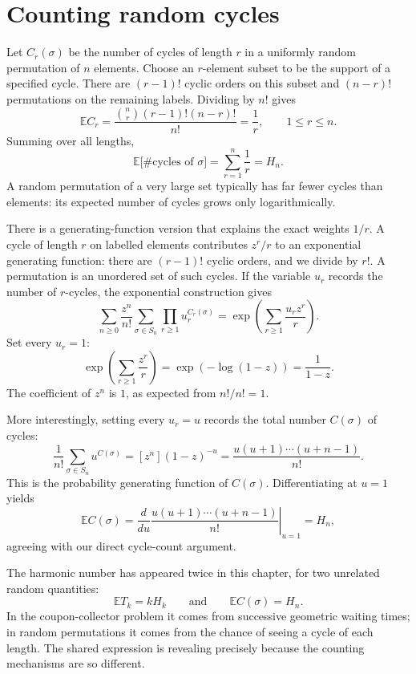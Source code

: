 \section{Counting random cycles}

Let \(C_r(\sigma)\) be the number of cycles of length \(r\) in a uniformly random permutation of \(n\) elements. Choose an \(r\)-element subset to be the support of a specified cycle. There are \((r-1)!\) cyclic orders on this subset and \((n-r)!\) permutations on the remaining labels. Dividing by \(n!\) gives
\[
 \boxed{\mathbb E C_r
 =\frac{\binom nr(r-1)!(n-r)!}{n!}
 =\frac1r,\qquad 1\le r\le n.}
\]
Summing over all lengths,
\[
 \boxed{\mathbb E\bigl[\#\text{cycles of }\sigma\bigr]
 =\sum_{r=1}^n\frac1r=H_n.}
\]
A random permutation of a very large set typically has far fewer cycles than elements: its expected number of cycles grows only logarithmically.

There is a generating-function version that explains the exact weights \(1/r\). A cycle of length \(r\) on labelled elements contributes \(z^r/r\) to an exponential generating function: there are \((r-1)!\) cyclic orders, and we divide by \(r!\). A permutation is an unordered set of such cycles. If the variable \(u_r\) records the number of \(r\)-cycles, the exponential construction gives
\[
 \boxed{
 \sum_{n\ge0}\frac{z^n}{n!}
 \sum_{\sigma\in S_n}\prod_{r\ge1}u_r^{C_r(\sigma)}
 =\exp\left(\sum_{r\ge1}\frac{u_rz^r}{r}\right).
 }
\]
Set every \(u_r=1\):
\[
 \exp\left(\sum_{r\ge1}\frac{z^r}{r}\right)
 =\exp(-\log(1-z))=\frac1{1-z}.
\]
The coefficient of \(z^n\) is \(1\), as expected from \(n!/n!=1\).

More interestingly, setting every \(u_r=u\) records the total number \(C(\sigma)\) of cycles:
\[
 \frac1{n!}\sum_{\sigma\in S_n}u^{C(\sigma)}
 =[z^n](1-z)^{-u}
 =\frac{u(u+1)\cdots(u+n-1)}{n!}.
\]
This is the probability generating function of \(C(\sigma)\). Differentiating at \(u=1\) yields
\[
 \mathbb E C(\sigma)=
 \left.\frac{d}{du}
 \frac{u(u+1)\cdots(u+n-1)}{n!}\right|_{u=1}
 =H_n,
\]
agreeing with our direct cycle-count argument.

The harmonic number has appeared twice in this chapter, for two unrelated random quantities:
\[
 \mathbb E T_k=kH_k
 \qquad\text{and}\qquad
 \mathbb E C(\sigma)=H_n.
\]
In the coupon-collector problem it comes from successive geometric waiting times; in random permutations it comes from the chance of seeing a cycle of each length. The shared expression is revealing precisely because the counting mechanisms are so different.

